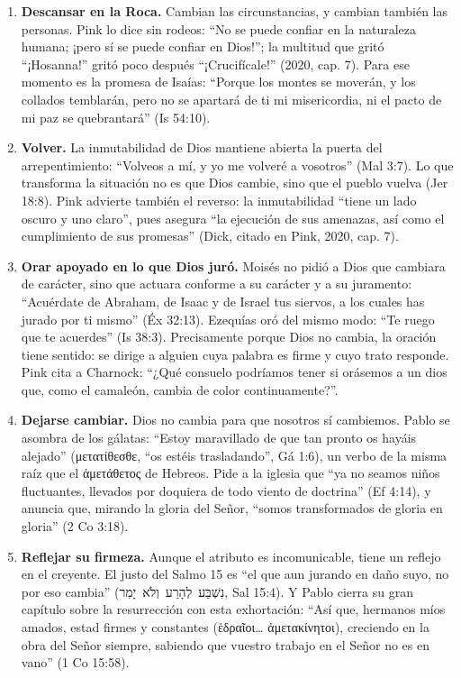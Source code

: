 \documentclass[11pt,letterpaper]{article}
\newcommand{\heb}[1]{\mbox{\foreignlanguage{hebrew}{#1}}}
\newcommand{\grc}[1]{\foreignlanguage{ancientgreek}{#1}}
\begin{document}
\begin{enumerate}
\item \textbf{Descansar en la Roca.} Cambian las circunstancias, y cambian también las personas. Pink lo dice sin rodeos: ``No se puede confiar en la naturaleza humana; ¡pero sí se puede confiar en Dios!''; la multitud que gritó ``¡Hosanna!'' gritó poco después ``¡Crucifícale!'' (2020, cap. 7). Para ese momento es la promesa de Isaías: ``Porque los montes se moverán, y los collados temblarán, pero no se apartará de ti mi misericordia, ni el pacto de mi paz se quebrantará'' (Is 54:10).

\item \textbf{Volver.} La inmutabilidad de Dios mantiene abierta la puerta del arrepentimiento: ``Volveos a mí, y yo me volveré a vosotros'' (Mal 3:7). Lo que transforma la situación no es que Dios cambie, sino que el pueblo vuelva (Jer 18:8). Pink advierte también el reverso: la inmutabilidad ``tiene un lado oscuro y uno claro'', pues asegura ``la ejecución de sus amenazas, así como el cumplimiento de sus promesas'' (Dick, citado en Pink, 2020, cap. 7).

\item \textbf{Orar apoyado en lo que Dios juró.} Moisés no pidió a Dios que cambiara de carácter, sino que actuara conforme a su carácter y a su juramento: ``Acuérdate de Abraham, de Isaac y de Israel tus siervos, a los cuales has jurado por ti mismo'' (Éx 32:13). Ezequías oró del mismo modo: ``Te ruego que te acuerdes'' (Is 38:3). Precisamente porque Dios no cambia, la oración tiene sentido: se dirige a alguien cuya palabra es firme y cuyo trato responde. Pink cita a Charnock: ``¿Qué consuelo podríamos tener si orásemos a un dios que, como el camaleón, cambia de color continuamente?''.

\item \textbf{Dejarse cambiar.} Dios no cambia para que nosotros sí cambiemos. Pablo se asombra de los gálatas: ``Estoy maravillado de que tan pronto os hayáis alejado'' (\grc{μετατίθεσθε}, ``os estéis trasladando'', Gá 1:6), un verbo de la misma raíz que el \grc{ἀμετάθετος} de Hebreos. Pide a la iglesia que ``ya no seamos niños fluctuantes, llevados por doquiera de todo viento de doctrina'' (Ef 4:14), y anuncia que, mirando la gloria del Señor, ``somos transformados de gloria en gloria'' (2 Co 3:18).

\item \textbf{Reflejar su firmeza.} Aunque el atributo es incomunicable, tiene un reflejo en el creyente. El justo del Salmo 15 es ``el que aun jurando en daño suyo, no por eso cambia'' (\heb{נִשְׁבַּע לְהָרַע וְלֹא יָמִר}, Sal 15:4). Y Pablo cierra su gran capítulo sobre la resurrección con esta exhortación: ``Así que, hermanos míos amados, estad firmes y constantes (\grc{ἑδραῖοι\ldots{} ἀμετακίνητοι}), creciendo en la obra del Señor siempre, sabiendo que vuestro trabajo en el Señor no es en vano'' (1 Co 15:58).
\end{enumerate}
\end{document}
